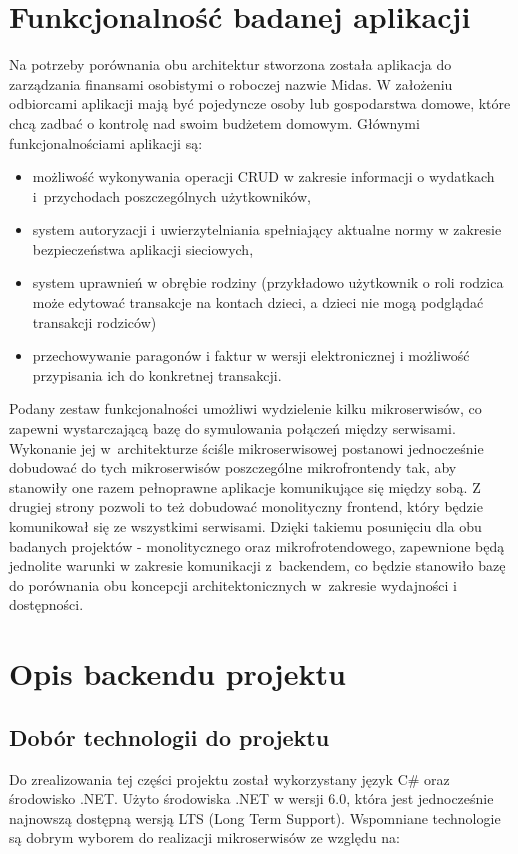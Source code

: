 \documentclass{SGGW-thesis}
\begin{document}
\chapter{Funkcjonalność badanej aplikacji}
Na potrzeby porównania obu architektur stworzona została aplikacja do zarządzania finansami osobistymi o roboczej nazwie Midas. W założeniu odbiorcami aplikacji mają być pojedyncze osoby lub gospodarstwa domowe, które chcą zadbać o kontrolę nad swoim budżetem domowym. Głównymi funkcjonalnościami aplikacji są:

  \begin{itemize}
    \item możliwość wykonywania operacji CRUD w zakresie informacji o wydatkach i~przychodach poszczególnych użytkowników,
    \item system autoryzacji i uwierzytelniania spełniający aktualne normy w zakresie bezpieczeństwa aplikacji sieciowych,
    \item system uprawnień w obrębie rodziny (przykładowo użytkownik o roli rodzica może edytować transakcje na kontach dzieci, a dzieci nie mogą podglądać transakcji rodziców)
    \item przechowywanie paragonów i faktur w wersji elektronicznej i możliwość przypisania ich do konkretnej transakcji.
  \end{itemize}

Podany zestaw funkcjonalności umożliwi wydzielenie kilku mikroserwisów, co zapewni wystarczającą bazę do symulowania połączeń między serwisami. Wykonanie jej w~architekturze ściśle mikroserwisowej postanowi jednocześnie dobudować do tych mikroserwisów poszczególne mikrofrontendy tak, aby stanowiły one razem pełnoprawne aplikacje komunikujące się między sobą. Z drugiej strony pozwoli to też dobudować monolityczny frontend, który będzie komunikował się ze wszystkimi serwisami. Dzięki takiemu posunięciu dla obu badanych projektów - monolitycznego oraz mikrofrotendowego, zapewnione będą jednolite warunki w zakresie komunikacji z~backendem, co będzie stanowiło bazę do porównania obu koncepcji architektonicznych w~zakresie wydajności i dostępności.

\chapter{Opis backendu projektu}
  \section{Dobór technologii do projektu}
  Do zrealizowania tej części projektu został wykorzystany język C\# oraz środowisko .NET. Użyto środowiska .NET w wersji 6.0, która jest jednocześnie najnowszą dostępną wersją LTS (Long Term Support). Wspomniane technologie są dobrym wyborem do realizacji mikroserwisów ze względu na:
  
\end{document}

